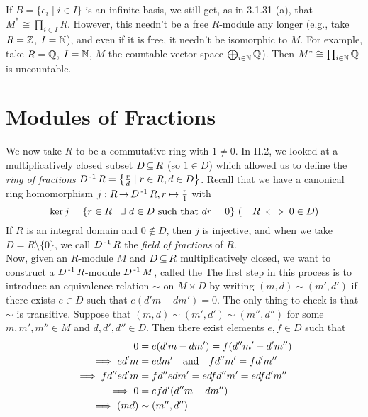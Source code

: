 \documentclass[11pt]{book}
\theoremstyle{definition}   \newtheorem{defn}[counter]{Definition} %
\newcommand{\bs}{\setminus}   \newcommand{\A}{\mathcal{A}}   \newcommand{\sy}{\textnormal{Syl}}   \newcommand{\size}[1]{\left| #1 \right|}
\DeclareMathOperator{\ra}{\rightarrow}   \DeclareMathOperator{\Poly}{\mathbf{P}}   \DeclareMathOperator{\spn}{\textnormal{span}}   \DeclareMathOperator{\aut}{\textnormal{Aut}}
\newcommand{\vs}{\vspace{8pt}}   \newcommand{\hs}{\hspace{8pt}}
\numberwithin{counter}{chapter}
\begin{document}
\vs

\begin{remark}
If $B = \{e_i \mid i \in I \}$ is an infinite basis, we still get, as in 3.1.31 (a), that $M^* \cong \prod_{i \in I} R$. However, this needn't be a free $R$-module any longer (e.g., take $R = \operatorname{\mathbb{Z}}$, $I = \operatorname{\mathbb{N}}$), and even if it is free, it needn't be isomorphic to $M$. For example, take $R = \operatorname{\mathbb{Q}}$, $I = \operatorname{\mathbb{N}}$, $M$ the countable vector space $\bigoplus_{i \in \operatorname{\mathbb{N}}} \operatorname{\mathbb{Q}}$). Then $M^* \cong \prod_{i \in \operatorname{\mathbb{N}}} \operatorname{\mathbb{Q}}$ is uncountable.
\end{remark}

\vs





\chapter{Modules of Fractions}

We now take $R$ to be a commutative ring with $1 \ne 0$. In II.2, we looked at a multiplicatively closed subset $D \operatorname{\subseteq} R$ (so $1 \in D$) which allowed us to define the \emph{ring of fractions} $D\operatorname{^{-1}} R = \left\{\frac{r}{d} \mid r \in R, d \in D\right\}$. Recall that we have a canonical ring homomorphism $j : R \ra D\inv R, r \mapsto \frac{r}{1}$ with
	\[\ker j = \{r \in R \mid \exists \ d \in D \textnormal{ such that } dr = 0\} \ (= R \iff 0 \in D) \]
If $R$ is an integral domain and $0 \notin D$, then $j$ is injective, and when we take $D = R \bs \{0\}$, we call $D\operatorname{^{-1}} R$ the \emph{field of fractions} of $R$. \\

Now, given an $R$-module $M$ and $D \operatorname{\subseteq} R$ multiplicatively closed, we want to construct a $D\operatorname{^{-1}} R$-module $D\operatorname{^{-1}} M$, called the  The first step in this process is to introduce an equivalence relation $\sim$ on $M \times D$ by writing $(m,d) \sim (m',d')$ if there exists $e \in D$ such that $e(d'm - dm') = 0$. The only thing to check is that $\sim$ is transitive. Suppose that $(m,d) \sim (m',d') \sim (m'',d'')$ for some $m,m',m'' \in M$ and $d,d',d'' \in D$. Then there exist elements $e,f \in D$ such that
\begin{align*}
0 &= e(d'm - dm') = f(d''m' - d'm'') \\
\implies ed'm &= edm' \quad \textnormal{and} \quad fd''m' = fd'm'' \\
\implies fd''ed'm &= fd''edm' = edfd''m' = edfd'm'' \\
\implies 0 &= efd'(d''m-dm'') \\
\implies (md) &\sim (m'',d'')
\end{align*}
\end{document}
